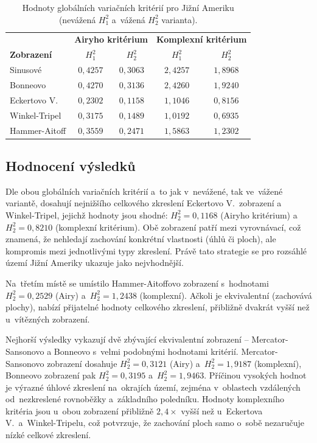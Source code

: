 \documentclass[11pt, a4paper]{article}
\begin{document}
\begin{table}[h!]
\centering
\begin{tabular}{l|cc|cc}
\toprule
& \multicolumn{2}{c|}{\textbf{Airyho kritérium}} & \multicolumn{2}{c}{\textbf{Komplexní kritérium}} \\
\textbf{Zobrazení} & $H_1^2$ & $H_2^2$ & $H_1^2$ & $H_2^2$ \\
\midrule
Sinusové        & $0{,}4257$ & $0{,}3063$ & $2{,}4257$ & $1{,}8968$ \\
Bonneovo        & $0{,}4270$ & $0{,}3136$ & $2{,}4260$ & $1{,}9240$ \\
Eckertovo V.    & $0{,}2302$ & $0{,}1158$ & $1{,}1046$ & $0{,}8156$ \\
Winkel-Tripel   & $0{,}3175$ & $0{,}1489$ & $1{,}0192$ & $0{,}6935$ \\
Hammer-Aitoff   & $0{,}3559$ & $0{,}2471$ & $1{,}5863$ & $1{,}2302$ \\
\bottomrule
\end{tabular}
\caption{Hodnoty globálních variačních kritérií pro Jižní Ameriku (nevážená $H_1^2$ a~vážená $H_2^2$ varianta).}
\label{tab:global}
\end{table}

\subsection{Hodnocení výsledků}

Dle obou globálních variačních kritérií a~to jak v~nevážené, tak ve~vážené variantě, dosahují nejnižšího celkového zkreslení Eckertovo V.\ zobrazení a Winkel-Tripel, jejichž hodnoty jsou shodné: $H_2^2 = 0{,}1168$ (Airyho kritérium) a~$H_2^2 = 0{,}8210$ (komplexní kritérium). Obě zobrazení patří mezi vyrovnávací, což znamená, že nehledají zachování konkrétní vlastnosti (úhlů či ploch), ale kompromis mezi jednotlivými typy zkreslení. Právě tato strategie se pro rozsáhlé území Jižní Ameriky ukazuje jako nejvhodnější.

Na~třetím místě se umístilo Hammer-Aitoffovo zobrazení s~hodnotami $H_2^2 = 0{,}2529$ (Airy) a~$H_2^2 = 1{,}2438$ (komplexní). Ačkoli je ekvivalentní (zachovává plochy), nabízí přijatelné hodnoty celkového zkreslení, přibližně dvakrát vyšší než u~vítězných zobrazení.

Nejhorší výsledky vykazují dvě zbývající ekvivalentní zobrazení -- Mercator-Sansonovo a Bonneovo s~velmi podobnými hodnotami kritérií. Mercator-Sansonovo zobrazení dosahuje $H_2^2 = 0{,}3121$ (Airy) a~$H_2^2 = 1{,}9187$ (komplexní), Bonneovo zobrazení pak $H_2^2 = 0{,}3195$ a~$H_2^2 = 1{,}9463$. Příčinou vysokých hodnot je výrazné úhlové zkreslení na~okrajích území, zejména v~oblastech vzdálených od~nezkreslené rovnoběžky a~základního poledníku. Hodnoty komplexního kritéria jsou u~obou zobrazení přibližně $2{,}4\times$ vyšší než u~Eckertova V.\ a~Winkel-Tripelu, což potvrzuje, že zachování ploch samo o~sobě nezaručuje nízké celkové zkreslení.
\end{document}
